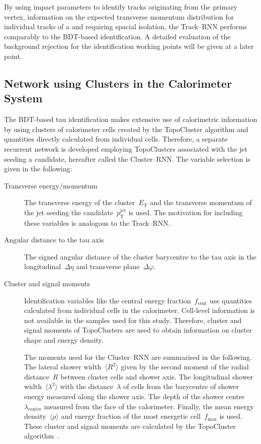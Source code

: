 By using impact parameters to identify tracks originating from the primary
vertex, information on the expected transverse momentum distribution for
individual tracks of a \tauhadvis and requiring spacial isolation, the
Track--RNN performs comparably to the BDT-based identification. A detailed
evaluation of the background rejection for the identification working points
will be given at a later point.

\subsection{Network using Clusters in the Calorimeter System}
\label{sec:rnn_clusters}

The BDT-based tau identification makes extensive use of calorimetric information
by using clusters of calorimeter cells created by the TopoCluster algorithm and
quantities directly calculated from individual cells. Therefore, a separate
recurrent network is developed employing TopoClusters associated with the jet
seeding a \tauhadvis candidate, hereafter called the Cluster--RNN. The variable
selection is given in the following:
\begin{description}
\item[Transverse energy/momentum] The transverse energy of the
  cluster~$E_\text{T}$ and the transverse momentum of the jet seeding the
  \tauhadvis candidate~$p_\text{T}^\text{jet}$ is used. The motivation for
  including these variables is analogous to the Track--RNN.

\item[Angular distance to the tau axis] The signed angular distance of the
  cluster barycentre to the tau axis in the longitudinal~$\Delta \eta$ and
  transverse plane~$\Delta \varphi$.

\item[Cluster and signal moments] Identification variables like the central
  energy fraction~$f_\text{cent}$ use quantities calculated from individual
  cells in the calorimeter. Cell-level information is not available in the
  samples used for this study. Therefore, cluster and signal moments of
  TopoClusters are used to obtain information on cluster shape and energy
  density.

  The moments used for the Cluster--RNN are summarised in the following. The
  lateral shower width~$\langle R^2 \rangle$ given by the second moment of the
  radial distance~$R$ between cluster cells and shower axis. The longitudinal
  shower width~$\langle \lambda^2 \rangle$ with the distance~$\lambda$ of cells
  from the barycentre of shower energy measured along the shower axis. The depth
  of the shower centre~$\lambda_\text{centre}$ measured from the face of the
  calorimeter. Finally, the mean energy density~$\langle \rho \rangle$ and
  energy fraction of the most energetic cell~$f_\text{max}$ is used. These
  cluster and signal moments are calculated by the TopoCluster
  algorithm~\cite{atlas_topoclustering}.
\end{description}
